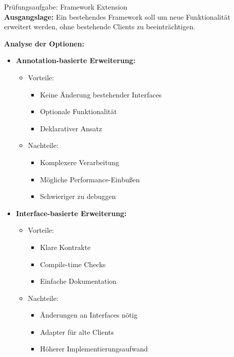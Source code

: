 \begin{example2}{Prüfungsaufgabe: Framework Extension}\\
\textbf{Ausgangslage:}
Ein bestehendes Framework soll um neue Funktionalität erweitert werden, ohne bestehende 
Clients zu beeinträchtigen.

\textbf{Analyse der Optionen:}
\begin{itemize}
    \item \textbf{Annotation-basierte Erweiterung:}
    \begin{itemize}
        \item Vorteile:
        \begin{itemize}
            \item Keine Änderung bestehender Interfaces
            \item Optionale Funktionalität
            \item Deklarativer Ansatz
        \end{itemize}
        \item Nachteile:
        \begin{itemize}
            \item Komplexere Verarbeitung
            \item Mögliche Performance-Einbußen
            \item Schwieriger zu debuggen
        \end{itemize}
    \end{itemize}
    
    \item \textbf{Interface-basierte Erweiterung:}
    \begin{itemize}
        \item Vorteile:
        \begin{itemize}
            \item Klare Kontrakte
            \item Compile-time Checks
            \item Einfache Dokumentation
        \end{itemize}
        \item Nachteile:
        \begin{itemize}
            \item Änderungen an Interfaces nötig
            \item Adapter für alte Clients
            \item Höherer Implementierungsaufwand
        \end{itemize}
    \end{itemize}
\end{itemize}
\end{example2}








